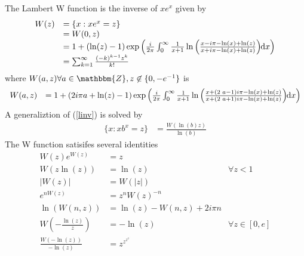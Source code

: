 \documentclass{amsart}
\newcommand{\mathd}{\mathrm{d}}
\newcommand{\nin}{\not\in}
\begin{document}
The Lambert W function {\cite{lambertw}}{\cite{lambertwss}} is the inverse of
$x e^x$ given by
\begin{equation}
  \begin{array}{ll}
    W (z) & =\{x : x e^x = z\}\\
    & = W (0, z)\\
    & = 1 + (\ln (z) - 1) \exp \left( \frac{i}{2 \pi} \int_0^{\infty}
    \frac{1}{x + 1} \ln \left( \frac{x - i \pi - \ln (x) + \ln (z)}{x + i \pi
    - \ln (x) + \ln (z)} \right) \hspace{-0.25em} \mathd x \right)\\
    & = \sum_{k = 1}^{\infty} \frac{(- k)^{k - 1} z^k}{k!}
  \end{array}  \label{linv}
\end{equation}
where $W (a, z) \forall a \in \mathbbm{Z}, z \nin \{0, - e^{- 1} \}$ is
\begin{equation}
  \begin{array}{ll}
    W (a, z) & = 1 + (2 i \pi a + \ln (  z) - 1) \exp \left( \frac{i}{2 \pi}
    \int_0^{\infty} \frac{1}{x + 1} \ln \left( \frac{x + \left( 2
    \hspace{0.25em} a - 1 \right) i \pi - \ln ( x) + \ln ( z)}{x + \left( 2
    \hspace{0.25em} a + 1 \right) i \pi - \ln ( x) + \ln ( z)} \right)
    \hspace{-0.25em} \mathd x \right)
  \end{array} \label{lambertw}
\end{equation}
A generaliztion of (\ref{linv}) is solved by
\begin{equation}
  \begin{array}{ll}
    \{x : x b^x = z\} & = \frac{W (\ln (b) z)}{\ln (b)}
  \end{array}
\end{equation}
The W function satisifes several identities
\begin{equation}
  \begin{array}{lll}
    W (z) e^{W (z)} & = z & \\
    W (z \ln (z)) & = \ln (z) & \forall z < 1\\
    |W (z) | & = W (|z|) & \\
    e^{n W (z)} & = z^n W (z)^{- n}  & \\
    \ln (W (n, z)) & = \ln (z) - W (n, z) + 2 i \pi n & \\
    W \left( - \frac{\ln (z)}{z} \right) & = - \ln (z) & \forall z \in [0,
    e]\\
    \frac{W (- \ln (z))}{- \ln (z)} & = z^{z^{z^{z^{.^{.^.}}}}} & 
  \end{array}
\end{equation}
\end{document}
